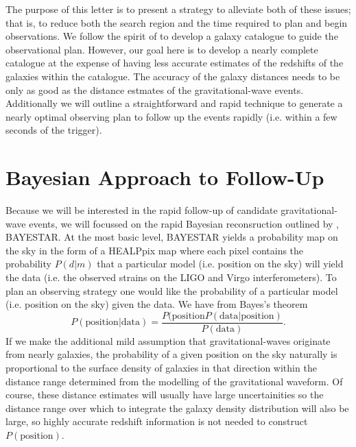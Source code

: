 \documentclass[useAMS,usenatbib]{mn2e}
\begin{document}
The purpose of this letter is to present a strategy to alleviate both
of these issues; that is, to reduce both the search region and the
time required to plan and begin observations.  We follow the spirit of
\citet{2015arXiv150803608G} to develop a galaxy catalogue to guide the
observational plan.  However, our goal here is to develop a nearly
complete catalogue at the expense of having less accurate estimates of
the redshifts of the galaxies within the catalogue.  The accuracy of
the galaxy distances needs to be only as good as the distance estmates
of the gravitational-wave events.  Additionally we will outline a
straightforward and rapid technique to generate a nearly optimal
observing plan to follow up the events rapidly (i.e. within a few
seconds of the trigger). 

\section{Bayesian Approach to Follow-Up}

Because we will be interested in the rapid follow-up of candidate
gravitational-wave events, we will focussed on the rapid Bayesian
reconsruction outlined by \citet{2015arXiv150803634S}, BAYESTAR.  At
the most basic level, BAYESTAR yields a probability map on the sky in
the form of a HEALPpix map \citep{2005ApJ...622..759G} where each
pixel contains the probability $P(d|m)$ that a particular model
(i.e. position on the sky) will yield the data (i.e. the observed
strains on the LIGO and Virgo interferometers).  To plan an observing
strategy one would like the probability of a particular model
(i.e. position on the sky) given the data.  We have from Bayes's
theorem
\begin{equation}
  P(\mathrm{position}|\mathrm{data}) = \frac{P(\mathrm{position}
    P(\mathrm{data}|\mathrm{position})}{P(\mathrm{data})}.
  \label{eq:1}
\end{equation}
If we make the additional mild assumption that gravitational-waves
originate from nearly galaxies, the probability of a given position on
the sky naturally is proportional to the surface density of galaxies
in that direction within the distance range determined from the
modelling of the gravitational waveform.  Of course, these distance
estimates will usually have large uncertainities so the distance range
over which to integrate the galaxy density distribution will also be
large, so highly accurate redshift information is not needed to
construct $P(\mathrm{position})$.
\end{document}
